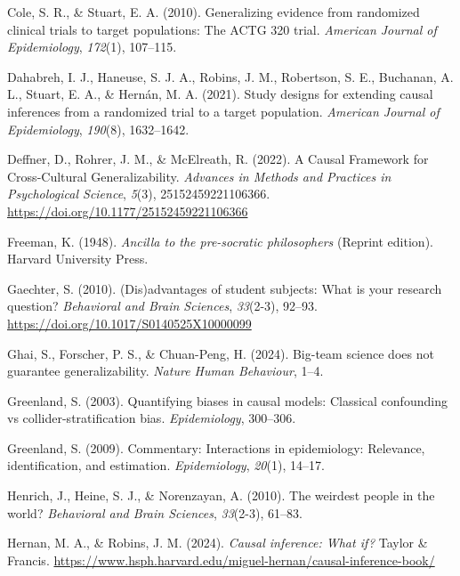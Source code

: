 \documentclass[
  single column]{article}
\newlength{\cslhangindent}
\newenvironment{CSLReferences}[2] %
 {\begin{list}{}{%
  \setlength{\itemindent}{0pt}
  \setlength{\leftmargin}{0pt}
  \setlength{\parsep}{0pt}
  \ifodd #1
   \setlength{\leftmargin}{\cslhangindent}
   \setlength{\itemindent}{-1\cslhangindent}
  \fi
  \setlength{\itemsep}{#2\baselineskip}}}
 {\end{list}}
\begin{document}
\begin{CSLReferences}{1}{0}
Cole, S. R., \& Stuart, E. A. (2010). Generalizing evidence from
randomized clinical trials to target populations: The ACTG 320 trial.
\emph{American Journal of Epidemiology}, \emph{172}(1), 107--115.

Dahabreh, I. J., Haneuse, S. J. A., Robins, J. M., Robertson, S. E.,
Buchanan, A. L., Stuart, E. A., \& Hernán, M. A. (2021). Study designs
for extending causal inferences from a randomized trial to a target
population. \emph{American Journal of Epidemiology}, \emph{190}(8),
1632--1642.

Deffner, D., Rohrer, J. M., \& McElreath, R. (2022). A Causal Framework
for Cross-Cultural Generalizability. \emph{Advances in Methods and
Practices in Psychological Science}, \emph{5}(3), 25152459221106366.
\url{https://doi.org/10.1177/25152459221106366}

Freeman, K. (1948). \emph{Ancilla to the pre-socratic philosophers}
(Reprint edition). Harvard University Press.

Gaechter, S. (2010). (Dis)advantages of student subjects: What is your
research question? \emph{Behavioral and Brain Sciences}, \emph{33}(2-3),
92--93. \url{https://doi.org/10.1017/S0140525X10000099}

Ghai, S., Forscher, P. S., \& Chuan-Peng, H. (2024). Big-team science
does not guarantee generalizability. \emph{Nature Human Behaviour},
1--4.

Greenland, S. (2003). Quantifying biases in causal models: Classical
confounding vs collider-stratification bias. \emph{Epidemiology},
300--306.

Greenland, S. (2009). Commentary: Interactions in epidemiology:
Relevance, identification, and estimation. \emph{Epidemiology},
\emph{20}(1), 14--17.

Henrich, J., Heine, S. J., \& Norenzayan, A. (2010). The weirdest people
in the world? \emph{Behavioral and Brain Sciences}, \emph{33}(2-3),
61--83.

Hernan, M. A., \& Robins, J. M. (2024). \emph{Causal inference: What
if?} Taylor \& Francis.
\url{https://www.hsph.harvard.edu/miguel-hernan/causal-inference-book/}


\end{CSLReferences}
\end{document}
